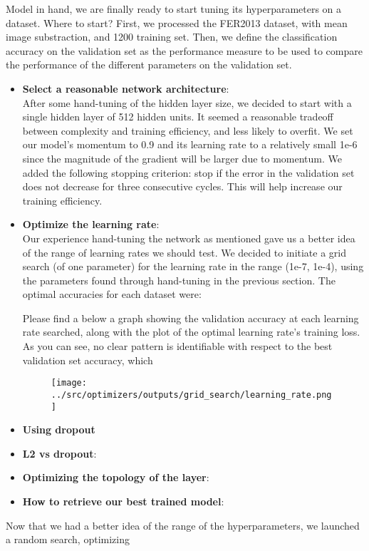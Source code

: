 Model in hand, we are finally ready to start tuning its hyperparameters on a dataset.
Where to start?
First, we processed the FER2013 dataset, with mean image substraction, and 1200 training set.
Then, we define the classification accuracy on the validation set as
the performance measure to be used to compare the performance of the different parameters on the validation set.

\begin{itemize}[topsep=-13pt]
\item \textbf{Select a reasonable network architecture}:\\
  After some hand-tuning of the hidden layer size, we decided to start with a single hidden layer of 512 hidden units.
  It seemed a reasonable tradeoff between complexity and training efficiency, and less likely to overfit.
  We set our model's momentum to 0.9 and its learning rate to a relatively small 1e-6
  since the magnitude of the gradient will be larger due to momentum.
  We added the following stopping criterion: stop if the error in the validation set does not decrease for three consecutive cycles.
  This will help increase our training efficiency.

\item \textbf{Optimize the learning rate}:\\
  Our experience hand-tuning the network as mentioned gave us a better idea of the range of learning rates we should test.
  We decided to initiate a grid search (of one parameter) for the learning rate in the range (1e-7, 1e-4),
  using the parameters found through hand-tuning in the previous section.
  The optimal accuracies for each dataset were:
  
  Please find a below a graph showing the validation accuracy at each learning rate searched,
  along with the plot of the optimal learning rate's training loss.
  As you can see, no clear pattern is identifiable with respect to the best validation set accuracy, which 
  \begin{figure}[!ht]
      \centering
      {{\texttt{[image: ../src/optimizers/outputs/grid\_search/learning\_rate.png]}}}
  \end{figure}


\item \textbf{Using dropout}\\


\item \textbf{L2 vs dropout}:\\

\item \textbf{Optimizing the topology of the layer}:\\  
  
\item \textbf{How to retrieve our best trained model}:\\
\end{itemize}
  



Now that we had a better idea of the range of the hyperparameters, we launched a random search, optimizing
